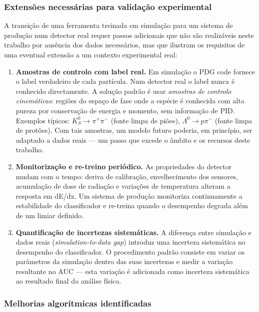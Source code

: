 \documentclass[12pt,a4paper]{article}
\begin{document}
\subsubsection{Extensões necessárias para validação experimental}

A transição de uma ferramenta treinada em simulação para um sistema de
produção num detector real requer passos adicionais que não são
realizáveis neste trabalho por ausência dos dados necessários, mas que
ilustram os requisitos de uma eventual extensão a um contexto experimental real:

\begin{enumerate}

  \item \textbf{Amostras de controlo com label real.}
    Em simulação o PDG code fornece o label verdadeiro de cada partícula.
    Num detector real o label nunca é conhecido directamente. A solução padrão
    é usar \textit{amostras de controlo cinemáticas}: regiões do espaço de
    fase onde a espécie é conhecida com alta pureza por conservação de energia
    e momento, sem informação de PID. Exemplos típicos:
    $K^0_S \to \pi^+\pi^-$ (fonte limpa de piões),
    $\Lambda^0 \to p\pi^-$ (fonte limpa de protões).
    Com tais amostras, um modelo futuro poderia, em princípio, ser adaptado
    a dados reais — um passo que excede o âmbito e os recursos deste trabalho.

  \item \textbf{Monitorização e re-treino periódico.}
    As propriedades do detector mudam com o tempo: deriva de calibração,
    envelhecimento dos sensores, acumulação de dose de radiação e variações
    de temperatura alteram a resposta em dE/dx. Um sistema de produção
    monitoriza continuamente a estabilidade do classificador e re-treina
    quando o desempenho degrada além de um limiar definido.

  \item \textbf{Quantificação de incertezas sistemáticas.}
    A diferença entre simulação e dados reais (\textit{simulation-to-data gap})
    introduz uma incerteza sistemática no desempenho do classificador. O
    procedimento padrão consiste em variar os parâmetros da simulação dentro
    das suas incertezas e medir a variação resultante no AUC --- esta variação
    é adicionada como incerteza sistemática ao resultado final da análise física.

\end{enumerate}

\subsubsection{Melhorias algorítmicas identificadas}
\end{document}

